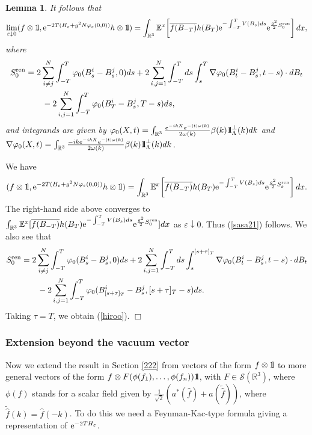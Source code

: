 \documentclass[11pt]{article}
\newtheorem{lemma}[theorem]{Lemma}
\newcommand{\bl}[1]{\begin{lemma}\label{#1}}
\newcommand{\el}{\end{lemma}}
\def\bbbone{{\mathchoice {\rm 1\mskip-4mu l} {\rm 1\mskip-4mu l}
{\rm 1\mskip-4.5mu l} {\rm 1\mskip-5mu l}}}
\def\one{\bbbone}
\newcommand{\kp}{\one_\Lambda^\perp(k)}
\newcommand{\Ebb}{{\mathbb E}}
\providecommand{\eq}[1]{\begin{equation}\label{#1}}
\providecommand{\en}{\end{equation}}
\providecommand{\qed}{\hfill {$\Box$}\par\medskip}
\providecommand{\BR}{{\mathbb{R}^3 }}
\providecommand{\iijj}{\sum_{i,j=1}^N}
\renewcommand{\ij}{\sum_{i\not=j}^N}
\providecommand{\kak}[1]{(\ref{#1})}
\providecommand{\hn}{H}%
\providecommand{\ms}[1]{\mathscr{#1}}
\providecommand{\add}{a^\ast}
\providecommand{\ov}[1]{\overline{#1}}
\providecommand{\non}{\nonumber}
\providecommand{\e}{{\rm e}}
\providecommand{\1}{\mathbb{1}}
\providecommand{\eps}{\varepsilon}
\providecommand{\ren}{{\rm ren}}
\begin{document}
\bl{maindenai}
It follows that
\eq{sasa21}
\lim_{\eps\downarrow 0} (f\otimes \one,\e^{-2T(\hn_\eps+g^2N\varphi_\eps(0,0))} h\otimes  \one)
= \int_{\BR} \Ebb^x\!\left[\ov{f(B_{-T})} h(B_T)\e^{-\int_{-T}^T V(B_s) ds} \e^{\frac{g^2}{2} S_0^\ren }
\right]dx,
\en
where
\begin{align}\label{hiroo}
S_0^\ren
&=
2\ij\int_{-T}^T \varphi_0(B_s^i-B_s^j,0)ds
 +2\iijj \int_{-T}^T ds\int_s^T\nabla\varphi_0(B_t^i-B_s^j,t-s) \cdot dB_t  \non \\
&
\qquad -2\iijj \int_{-T}^T \varphi_0(B_T^i-B_s^j,T-s)ds,
\end{align}
and 
integrands are given by 
$
\varphi_0(X,t)=\int_\BR\frac{e^{-ikX}e^{-|t|\omega(k)}}{2\omega(k)}\beta(k) \kp dk$ 
and 
$
\nabla \varphi_0(X,t)=\int_\BR\frac{-ik e^{-ikX}e^{-|t|\omega(k)}}{2\omega(k)}\beta(k) \kp dk$.
\el
\proof
We have
\eq{554321}
(f\otimes \one, \e^{-2T(\hn_\eps+g^2N\varphi_\eps(0,0))}h\otimes  \one) =
\int_{\BR} \Ebb^x\!\left[\ov{f(B_{-T})} h(B_T)\e^{-\int_{-T}^T V(B_s) ds}
\e^{\frac{g^2}{2} S_\eps^\ren } \right]dx .
\en
The right-hand  side above converges to $\int_{\BR} \Ebb^x [\ov{f(B_{-T})} h(B_T)
\e^{-\int_{-T}^T V(B_s) ds}\e^{\frac{g^2}{2} S_0^\ren} ]dx$ as $\eps\downarrow 0$.
Thus \kak{sasa21} follows. We also see that
\begin{align}
S_0^\ren
&=
2 \ij \int_{-T}^T \varphi_0(B_s^i-B_s^j,0) ds
+ 2\iijj \int_{-T}^T ds\int_s^{[s+\tau]_T}\nabla\varphi_0 (B_t^i-B_s^j,t-s) \cdot dB_t\non\\
&
\qquad - 2\iijj \int_{-T}^T \varphi_0(B^i_{[s+\tau]_T}-B^j_s,[s+\tau]_T-s) ds
.
\end{align}
Taking $\tau=T$, we obtain \kak{hiroo}.
\qed



\subsubsection{Extension beyond the vacuum vector}
Now we extend the result in Section \ref{222} from vectors of the form $f\otimes \one$ to more general
vectors of the form $f\otimes F(\phi(f_1),\ldots,\phi(f_n))\one $, with $F\in \ms  S(\BR)$, where
$\phi(f)$ stands for a scalar field given by
$\frac{1}{\sqrt 2} (\add(\hat f)+a(\widetilde{\hat f}))$,  where $\widetilde{\hat f}(k)=\hat f(-k)$.
To do this we
need a Feynman-Kac-type formula giving a representation of $\e^{-2T H_\eps}$.
\end{document}
